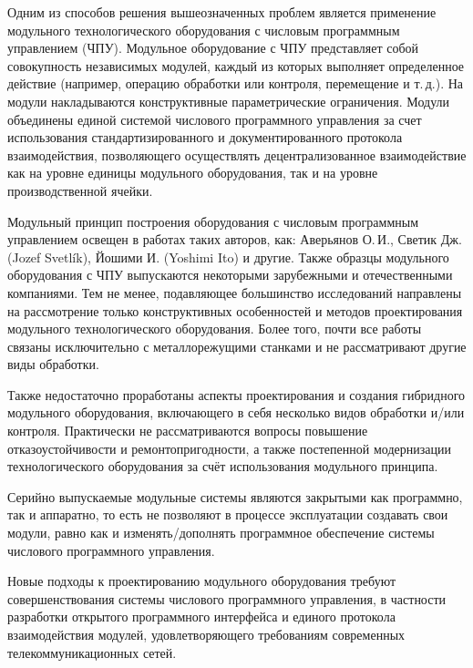 Одним из способов решения вышеозначенных проблем является применение модульного технологического оборудования с числовым программным управлением (ЧПУ). Модульное оборудование с ЧПУ представляет собой совокупность независимых модулей, каждый из которых выполняет определенное действие (например, операцию обработки или контроля, перемещение и т.\,д.). На модули накладываются конструктивные параметрические ограничения. Модули объединены единой системой числового программного управления за счет использования стандартизированного и документированного протокола взаимодействия, позволяющего осуществлять децентрализованное взаимодействие как на уровне единицы модульного оборудования, так и на уровне производственной ячейки. 

Модульный принцип построения оборудования с числовым программным управлением освещен в работах таких авторов, как: Аверьянов О.\,И., Светик Дж. (Jozef Svetl\'ik), Йошими И. (Yoshimi Ito) и другие. Также образцы модульного оборудования с ЧПУ выпускаются некоторыми зарубежными и отечественными компаниями. Тем не менее, подавляющее большинство исследований направлены на рассмотрение только конструктивных особенностей и методов проектирования модульного технологического оборудования. Более того, почти все работы связаны исключительно с металлорежущими станками и не рассматривают другие виды обработки.

Также недостаточно проработаны аспекты проектирования и создания гибридного модульного оборудования, включающего в себя несколько видов обработки и/или контроля. Практически не рассматриваются вопросы повышение отказоустойчивости и ремонтопригодности, а также постепенной модернизации технологического оборудования за счёт использования модульного принципа.

Серийно выпускаемые модульные системы являются закрытыми как программно, так и аппаратно, то есть не позволяют в процессе эксплуатации создавать свои модули, равно как и изменять/дополнять программное обеспечение системы числового программного управления. 

Новые подходы к проектированию модульного оборудования требуют совершенствования системы числового программного управления, в частности разработки открытого программного интерфейса и единого протокола взаимодействия модулей, удовлетворяющего требованиям современных телекоммуникационных сетей.


